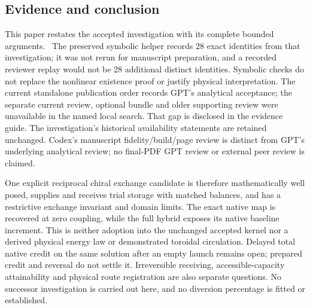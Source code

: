 \subsection{Evidence and conclusion}\label{sec:conclusion}
This paper restates the accepted investigation with its complete bounded arguments.~\cite{investigation} The preserved symbolic helper records 28 exact identities from that investigation; it was not rerun for manuscript preparation, and a recorded reviewer replay would not be 28 additional distinct identities. Symbolic checks do not replace the nonlinear existence proof or justify physical interpretation. The current standalone publication order records GPT's analytical acceptance; the separate current review, optional bundle and older supporting review were unavailable in the named local search. That gap is disclosed in the evidence guide. The investigation's historical availability statements are retained unchanged. Codex's manuscript fidelity/build/page review is distinct from GPT's underlying analytical review; no final-PDF GPT review or external peer review is claimed.

One explicit reciprocal chiral exchange candidate is therefore mathematically well posed, supplies and receives trial storage with matched balances, and has a restrictive exchange invariant and domain limits. The exact native map is recovered at zero coupling, while the full hybrid exposes its native baseline increment. This is neither adoption into the unchanged accepted kernel nor a derived physical energy law or demonstrated toroidal circulation. Delayed total native credit on the same solution after an empty launch remains open; prepared credit and reversal do not settle it. Irreversible receiving, accessible-capacity attainability and physical route registration are also separate questions. No successor investigation is carried out here, and no diversion percentage is fitted or established.
